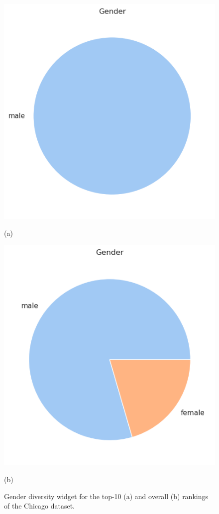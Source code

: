 \begin{itemize}
\begin{figure}[t!]
\centering
\begin{minipage}{0.45\textwidth}
\centering
\includegraphics[width=\textwidth]{figures/chicago_rankingfacts3a.png}
\caption*{(a)}
\end{minipage}
\begin{minipage}{0.45\textwidth}
\centering
\includegraphics[width=\textwidth]{figures/chicago_rankingfacts3b.png}
\caption*{(b)}
\end{minipage}
\caption{\textrm{Gender} diversity widget for the top-10 (a) and overall (b) rankings of the Chicago dataset.}
\label{fig:chicago_rankingfacts3}
\end{figure}

\end{itemize}


